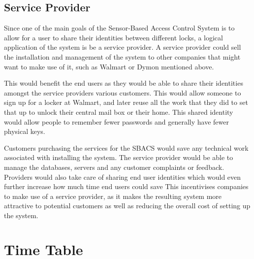 \documentclass{article}
\begin{document}

\subsection{Service Provider}

Since one of the main goals of the Sensor-Based Access Control System is to allow for a user to share their identities
between different locks, a logical application of the system is be a service provider. A service provider could sell the
installation and management of the system to other companies that might want to make use of it, such as Walmart or
Dymon mentioned above.

This would benefit the end users as they would be able to share their identities amongst the service providers various
customers. This would allow someone to sign up for a locker at Walmart, and later reuse all the work that they did to
set that up to unlock their central mail box or their home. This shared identity would allow people to remember fewer
passwords and generally have fewer physical keys.

Customers purchasing the services for the SBACS would save any technical work associated with installing the system.
The service provider would be able to manage the databases, servers and any customer complaints or feedback. Providers
would also take care of sharing end user identities which would even further increase how much time end users could save
This incentivises companies to make use of a service provider, as it makes the resulting system more attractive to
potential customers as well as reducing the overall cost of setting up the system.

\newpage %
\section{Time Table}
\end{document}
